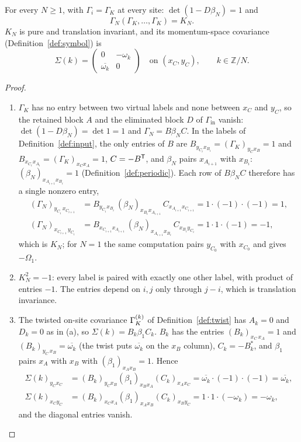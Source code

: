 \begin{theorem}\label{thm:kitaev}
For every $N\geq1$, with $\Gamma_i=\Gamma_K$ at every site: $\det(1-D\beta_N)=1$ and
\[
 \Gamma_N(\Gamma_K,\ldots,\Gamma_K)=K_N .
\]
$K_N$ is pure and translation invariant, and its momentum-space covariance
(Definition~\ref{def:symbol}) is
\[
 \Sigma(k)=\begin{pmatrix}0&-\omega_k\\ \overline{\omega_k}&0\end{pmatrix}
 \quad\text{on }(x_C,y_C),\qquad k\in\mathbb Z/N .
\]
\end{theorem}
\begin{proof}
\begin{enumerate}
\item[(a)] $\Gamma_K$ has no entry between two virtual labels and none between $x_C$ and
$y_C$, so the retained block $A$ and the eliminated block $D$ of $\Gamma_{\mathrm{in}}$
vanish: $\det(1-D\beta_N)=\det1=1$ and $\Gamma_N=B\beta_NC$. In the labels of
Definition~\ref{def:input}, the only entries of $B$ are
$B_{y_{C_i}x_{B_i}}=(\Gamma_K)_{y_Cx_B}=1$ and $B_{x_{C_i}x_{A_i}}=(\Gamma_K)_{x_Cx_A}=1$,
$C=-B^{\mathsf T}$, and $\beta_N$ pairs $x_{A_{i+1}}$ with $x_{B_i}$:
$(\beta_N)_{x_{A_{i+1}}x_{B_i}}=1$ (Definition~\ref{def:periodic}). Each row of $B\beta_NC$
therefore has a single nonzero entry,
\begin{align*}
 (\Gamma_N)_{y_{C_i}\,x_{C_{i+1}}}&=B_{y_{C_i}x_{B_i}}\,(\beta_N)_{x_{B_i}x_{A_{i+1}}}\,C_{x_{A_{i+1}}x_{C_{i+1}}}
 =1\cdot(-1)\cdot(-1)=1,\\
 (\Gamma_N)_{x_{C_{i+1}}\,y_{C_i}}&=B_{x_{C_{i+1}}x_{A_{i+1}}}\,(\beta_N)_{x_{A_{i+1}}x_{B_i}}\,C_{x_{B_i}y_{C_i}}
 =1\cdot1\cdot(-1)=-1,
\end{align*}
which is $K_N$; for $N=1$ the same computation pairs $y_{C_0}$ with $x_{C_0}$ and gives $-\Omega_1$.
\item[(b)] $K_N^2=-1$: every label is paired with exactly one other label, with product of
entries $-1$. The entries depend on $i,j$ only through $j-i$, which is translation
invariance.
\item[(c)] The twisted on-site covariance $\Gamma_K^{(k)}$ of Definition~\ref{def:twist} has
$A_k=0$ and $D_k=0$ as in (a), so $\Sigma(k)=B_k\beta_1C_k$. $B_k$ has the entries
$(B_k)_{x_C\,x_A}=1$ and $(B_k)_{y_C\,x_B}=\overline{\omega_k}$ (the twist puts
$\overline{\omega_k}$ on the $x_B$ column), $C_k=-B_k^*$, and $\beta_1$ pairs $x_A$ with
$x_B$ with $(\beta_1)_{x_Ax_B}=1$. Hence
\begin{align*}
 \Sigma(k)_{y_Cx_C}&=(B_k)_{y_Cx_B}(\beta_1)_{x_Bx_A}(C_k)_{x_Ax_C}=\overline{\omega_k}\cdot(-1)\cdot(-1)=\overline{\omega_k},\\
 \Sigma(k)_{x_Cy_C}&=(B_k)_{x_Cx_A}(\beta_1)_{x_Ax_B}(C_k)_{x_By_C}=1\cdot1\cdot(-\omega_k)=-\omega_k,
\end{align*}
and the diagonal entries vanish. \qedhere
\end{enumerate}
\end{proof}

